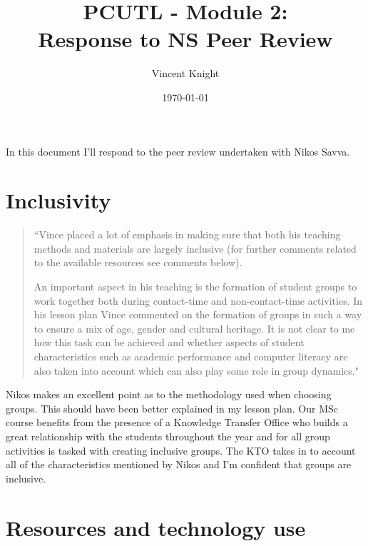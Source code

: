 \documentclass[a4paper,12pt]{article}
\title{PCUTL - Module 2:\\ Response to NS Peer Review}
\author{Vincent Knight}
\date{\today}
\begin{document}
\maketitle

In this document I'll respond to the peer review undertaken with Nikos Savva.


\section{Inclusivity}

\begin{quote}
``Vince placed a lot of emphasis in making sure that both his teaching methods and materials are largely inclusive (for further comments related to the available resources see comments below).

An important aspect in his teaching is the formation of student groups to work together both during contact-time and non-contact-time activities. In his lesson plan Vince commented on the formation of groups in such a way to ensure a mix of age, gender and cultural heritage. It is not clear to me how this task can be achieved and whether aspects of student characteristics such as academic performance and computer literacy are also taken into account which can also play some role in group dynamics."
\end{quote}

Nikos makes an excellent point as to the methodology used when choosing groups. This should have been better explained in my lesson plan. Our MSc course benefits from the presence of a Knowledge Transfer Office who builds a great relationship with the students throughout the year and for all group activities is tasked with creating inclusive groups. The KTO takes in to account all of the characteristics mentioned by Nikos and I'm confident that groups are inclusive.

\section{Resources and technology use}
\end{document}
